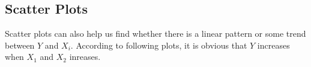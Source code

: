 \documentclass[a4paper,11pt,onecolumn,twoside]{article}
\begin{document}
\subsection{Scatter Plots}
Scatter plots can also help us find whether there is a linear pattern or some trend between $Y$ and $X_i$. According to following plots, it is obvious that $Y$ increases when $X_1$ and $X_2$ inreases.
\begin{figure}[H]
	\centering
\end{figure}
\end{document}
